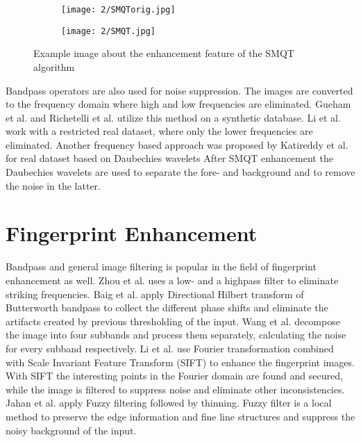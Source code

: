 \documentclass[draft,final]{vutinfth} %
\begin{document}
\begin{figure}[h]
  \centering
  \begin{subfigure}[b]{0.4\columnwidth}
    \centering
    \texttt{[image: 2/SMQTorig.jpg]}
    \label{fig:rw:SMQTin}
  \end{subfigure}
  \begin{subfigure}[b]{0.4\columnwidth}
    \centering
    \texttt{[image: 2/SMQT.jpg]}
    \label{fig:rw:SMQTout}
  \end{subfigure}
  \caption{Example image about the enhancement feature of the SMQT algorithm \cite{katireddy2017novel} }
  \label{fig:rw:SMQT} %
\end{figure}

\par
Bandpass operators are also used for noise suppression.
The images are converted to the frequency domain where high and low frequencies are eliminated.
Gueham et al. \cite{gueham2007automatic} and Richetelli et al. \cite{richetelli2017classification} utilize this method on a synthetic database.
Li et al. \cite{li2014retrieval} work with a restricted real dataset, where only the lower frequencies are eliminated.
Another frequency based approach was proposed by Katireddy et al. \cite{katireddy2017novel} for real dataset based on Daubechies wavelets
After SMQT enhancement the Daubechies wavelets are used to separate the fore- and background and to remove the noise in the latter.

\section*{Fingerprint Enhancement}

Bandpass and general image filtering is popular in the field of fingerprint enhancement as well.
Zhou et al. \cite{zhou2011adaptive} uses a low- and a highpass filter to eliminate striking frequencies. 
Baig et al. \cite{baig2015enhancement} apply Directional Hilbert transform of Butterworth bandpass to collect the different phase shifts and eliminate the artifacts created by previous thresholding of the input.
Wang et al. \cite{wang2014enhanced} decompose the image into four subbands and process them separately, calculating the noise for every subband respectively.
Li et al. \cite{li2012texture} use Fourier transformation combined with Scale Invariant Feature Transform (SIFT) \cite{lowe1999object} to enhance the fingerprint images. 
With SIFT the interesting points in the Fourier domain are found and secured, while the image is filtered to suppress noise and eliminate other inconsistencies.
Jahan et al. \cite{jahan2017robust} apply Fuzzy filtering followed by thinning.
Fuzzy filter is a local method to preserve the edge information and fine line structures and suppress the noisy background of the input.
\end{document}
